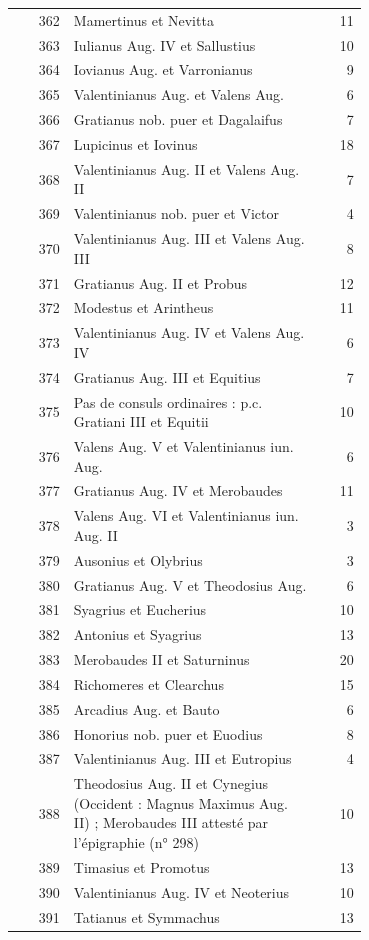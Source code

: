 \begin{longtable}{@{}r p{0.70\linewidth} r@{}}
362 & Mamertinus et Nevitta & 11 \\
363 & Iulianus Aug. IV et Sallustius & 10 \\
364 & Iovianus Aug. et Varronianus & 9 \\
365 & Valentinianus Aug. et Valens Aug. & 6 \\
366 & Gratianus nob. puer et Dagalaifus & 7 \\
367 & Lupicinus et Iovinus & 18 \\
368 & Valentinianus Aug. II et Valens Aug. II & 7 \\
369 & Valentinianus nob. puer et Victor & 4 \\
370 & Valentinianus Aug. III et Valens Aug. III & 8 \\
371 & Gratianus Aug. II et Probus & 12 \\
372 & Modestus et Arintheus & 11 \\
373 & Valentinianus Aug. IV et Valens Aug. IV & 6 \\
374 & Gratianus Aug. III et Equitius & 7 \\
375 & Pas de consuls ordinaires : p.c. Gratiani III et Equitii & 10 \\
376 & Valens Aug. V et Valentinianus iun. Aug. & 6 \\
377 & Gratianus Aug. IV et Merobaudes & 11 \\
378 & Valens Aug. VI et Valentinianus iun. Aug. II & 3 \\
379 & Ausonius et Olybrius & 3 \\
380 & Gratianus Aug. V et Theodosius Aug. & 6 \\
381 & Syagrius et Eucherius & 10 \\
382 & Antonius et Syagrius & 13 \\
383 & Merobaudes II et Saturninus & 20 \\
384 & Richomeres et Clearchus & 15 \\
385 & Arcadius Aug. et Bauto & 6 \\
386 & Honorius nob. puer et Euodius & 8 \\
387 & Valentinianus Aug. III et Eutropius & 4 \\
388 & Theodosius Aug. II et Cynegius (Occident : Magnus Maximus Aug. II) ; Merobaudes III attesté par l'épigraphie (n° 298) & 10 \\
389 & Timasius et Promotus & 13 \\
390 & Valentinianus Aug. IV et Neoterius & 10 \\
391 & Tatianus et Symmachus & 13 \\

\end{longtable}
